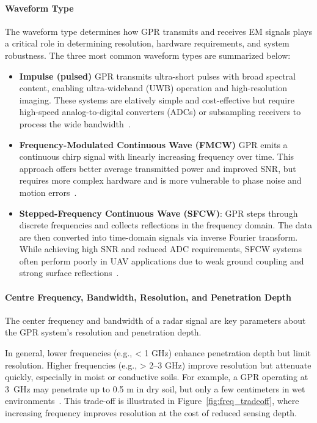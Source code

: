 \paragraph{Waveform Type}

The waveform type determines how GPR transmits and receives EM signals plays a critical role in determining resolution, hardware requirements, and system robustness. The three most common waveform types are summarized below:

\begin{itemize}
    \item \textbf{Impulse (pulsed)} GPR transmits ultra-short pulses with broad spectral content, enabling ultra-wideband (UWB) operation and high-resolution imaging. These systems are elatively simple and cost-effective but require high-speed analog-to-digital converters (ADCs) or subsampling receivers to process the wide bandwidth~\cite{chen2023ground,sipos2017drone}.

    \item \textbf{Frequency-Modulated Continuous Wave (FMCW)} GPR emits a continuous chirp signal with linearly increasing frequency over time. This approach offers better average transmitted power and improved SNR, but requires more complex hardware and is more vulnerable to phase noise and motion errors~\cite{burr2018design}.
    
    \item \textbf{Stepped-Frequency Continuous Wave (SFCW)}: GPR steps through discrete frequencies and collects reflections in the frequency domain. The data are then converted into time-domain signals via inverse Fourier transform. While achieving high SNR and reduced ADC requirements, SFCW systems often perform poorly in UAV applications due to weak ground coupling and strong surface reflections~\cite{tronca2018comparison}.
\end{itemize}


\paragraph{Centre Frequency, Bandwidth, Resolution, and Penetration Depth}

The center frequency and bandwidth of a radar signal are key parameters about the GPR system’s resolution and penetration depth. 

In general, lower frequencies (e.g., < 1 GHz) enhance penetration depth but limit resolution. Higher frequencies (e.g., > 2--3 GHz) improve resolution but attenuate quickly, especially in moist or conductive soils. For example, a GPR operating at 3~GHz may penetrate up to 0.5 m in dry soil, but only a few centimeters in wet environments~\cite{alqudsi2021review}. This trade-off is illustrated in Figure~\ref{fig:freq_tradeoff}, where increasing frequency improves resolution at the cost of reduced sensing depth.

